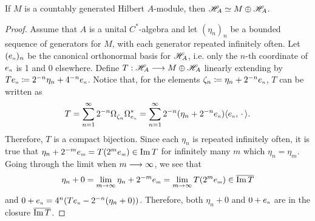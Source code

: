 \begin{teorema}
\label{teo: kasparov stabilization}
If $M$ is a countably generated Hilbert $A$-module, then $\mathscr H_A \simeq M\oplus \mathscr H_A$.

\begin{proof}
 Assume that $A$ is a unital $C^*$-algebra and let $(\eta_n)_n$ be a bounded sequence of generators for $M$, with each generator repeated infinitely often. Let $(\sub e n)_n$ be the canonical orthonormal basis for $\mathscr H_A$, i.e. only the $n$-th coordinate of $\sub e n$ is 1 and 0 elsewhere. Define $T:\mathscr H_A\longrightarrow M\oplus \mathscr H_A$ linearly extending by $T\sub e n \coloneqq 2^{-n} \eta_n + 4^{-n}\sub e n$. Notice that, for the elements $\zeta_n \coloneqq \eta_n+2^{-n}\sub e n$, $T$ can be written as
\begin{equation*}
T = \sum_{n=1}^\infty 2^{-n} \Omega^{\vphantom{*}}_{\zeta_n}\Omega^*_{\sub e n} =  \sum_{n=1}^\infty 2^{-n} (\eta_n+2^{-n}\sub e n)\inner{\sub e n}{\come}.
\end{equation*}
Therefore, $T$ is a compact bijection. Since each $\eta_n$ is repeated infinitely often, it is true that $\eta_n + 2^{-m}\sub e m = T(2^m\sub e m)\in \Im T$ for infinitely many $m$ which $\eta_n=\eta_m$. Going through the limit when $m\longrightarrow \infty$, we see that 
\begin{equation*}
    \eta_n + 0 = \lim_{m\to \infty} \eta_n + 2^{-m}\sub e m = \lim_{m\to \infty} T(2^m\sub e m) \in \con{\Im T}
\end{equation*}
and $0 + \sub e n = 4^n (T\sub e n - 2^{-n}(\eta_n + 0))$. Therefore, both $\eta_n + 0$ and $0+\sub e n$ are in the closure $\overline{\operatorname{Im} T}$.


\end{proof}
\end{teorema}
